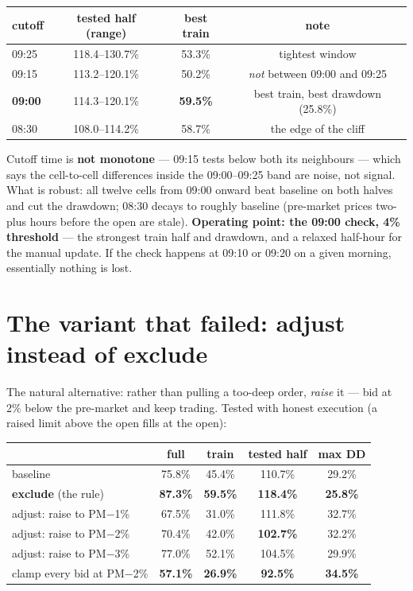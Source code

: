 \documentclass[11pt,a4paper]{article}
\newcommand{\good}[1]{{\color{bcteal}\textbf{#1}}}
\newcommand{\bad}[1]{{\color{bcred}\textbf{#1}}}
\begin{document}
\begin{center}
\begin{tabular}{lccc}
\toprule
cutoff & tested half (range) & best train & note \\
\midrule
09:25 & 118.4--130.7\% & 53.3\% & tightest window \\
09:15 & 113.2--120.1\% & 50.2\% & \emph{not} between 09:00 and 09:25 \\
\textbf{09:00} & 114.3--120.1\% & \good{59.5\%} & best train, best drawdown (25.8\%) \\
08:30 & 108.0--114.2\% & 58.7\% & the edge of the cliff \\
\bottomrule
\end{tabular}
\end{center}

Cutoff time is \textbf{not monotone} --- 09:15 tests below both its neighbours
--- which says the cell-to-cell differences inside the 09:00--09:25 band are
noise, not signal. What is robust: all twelve cells from 09:00 onward beat
baseline on both halves and cut the drawdown; 08:30 decays to roughly
baseline (pre-market prices two-plus hours before the open are stale).
\textbf{Operating point: the 09:00 check, 4\% threshold} --- the strongest
train half and drawdown, and a relaxed half-hour for the manual update. If the
check happens at 09:10 or 09:20 on a given morning, essentially nothing is
lost.

\section{The variant that failed: adjust instead of exclude}

The natural alternative: rather than pulling a too-deep order, \emph{raise} it
--- bid at 2\% below the pre-market and keep trading. Tested with honest
execution (a raised limit above the open fills at the open):

\begin{center}
\begin{tabular}{lcccc}
\toprule
 & full & train & tested half & max DD \\
\midrule
baseline                      & 75.8\% & 45.4\% & 110.7\% & 29.2\% \\
\textbf{exclude} (the rule)   & \good{87.3\%} & \good{59.5\%} & \good{118.4\%} & \good{25.8\%} \\
adjust: raise to PM$-$1\%     & 67.5\% & 31.0\% & 111.8\% & 32.7\% \\
adjust: raise to PM$-$2\%     & 70.4\% & 42.0\% & \bad{102.7\%} & 32.2\% \\
adjust: raise to PM$-$3\%     & 77.0\% & 52.1\% & 104.5\% & 29.9\% \\
clamp every bid at PM$-$2\%   & \bad{57.1\%} & \bad{26.9\%} & \bad{92.5\%} & \bad{34.5\%} \\
\bottomrule
\end{tabular}
\end{center}
\end{document}
